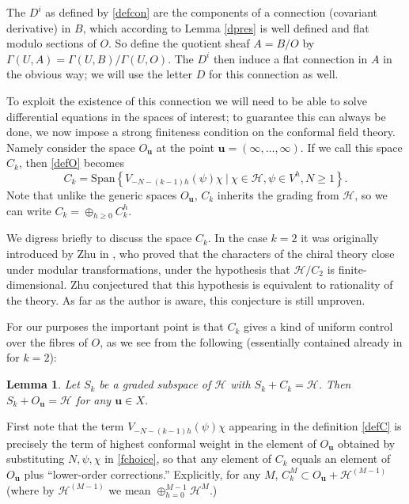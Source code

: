 \documentclass[a4paper,12pt]{article}
\newcommand{\Span}{\mathrm{Span}}
\newcommand{\uu}{{\mathbf u}}
\newcommand{\F}{{\mathcal H}}
\newtheorem{lem}[defn]{Lemma}
\newcommand{\oproof}[1]{\noindent {\bf Proof#1.\ }}
\begin{document}
The $D^i$ as defined by \eqref{defcon} are the components of a connection (covariant derivative) in $B$, which
according to Lemma \eqref{dpres} is well defined and flat modulo sections of $O$.
So define the quotient sheaf $A = B/O$ by $\Gamma(U,A) = \Gamma(U,B) / \Gamma(U,O)$.
The $D^i$ then induce a flat connection in $A$
in the obvious way; we will use the letter $D$ for this connection as well.

To exploit the existence of this connection we will need to be able to solve differential equations
in the spaces of interest; to guarantee this can always be done, we now impose a strong
finiteness condition on the conformal field theory.  Namely consider the space 
$O_\uu$ at the point $\uu = (\infty, \dots, \infty)$.  If we call this space $C_k$, then \eqref{defO} becomes
\begin{equation} \label{defC}
C_k = \Span\left\{ V_{-N-(k-1)h}(\psi) \chi \ \Big\vert \ \chi \in \F, \psi \in V^h, N \ge 1 \right\}.
\end{equation}
Note that unlike the generic spaces $O_\uu$, $C_k$ inherits the grading from $\F$, so we can write $C_k = \oplus_{h \ge 0} C_k^h$.

We digress briefly to discuss the space $C_k$.  In the case $k=2$ it was originally introduced by Zhu in \cite{Zhu}, who
proved that the characters of the chiral theory close under modular transformations, under the 
hypothesis that $\F / C_2$ is finite-dimensional.  Zhu conjectured that this hypothesis is equivalent to
rationality of the theory.  As far as the author is aware, this conjecture is still unproven.

For our purposes the important point is that 
$C_k$ gives a kind of uniform control over the fibres of $O$, as we see from the following (essentially contained
already in \cite{Zhu} for $k=2$):

\begin{lem} \label{basislem} Let $S_k$ be a graded subspace of $\F$ with $S_k + C_k = \F$.  Then $S_k + O_\uu = \F$ for any $\uu \in X$.
\end{lem}
\oproof{}
First note that the term $V_{-N-(k-1)h}(\psi) \chi$ appearing in the definition \eqref{defC} is precisely 
the term of highest conformal weight
in the element of $O_\uu$ obtained by substituting $N, \psi, \chi$ in \eqref{fchoice}, so that any
element of $C_k$ equals an element of $O_\uu$ plus ``lower-order corrections.''  Explicitly, for any $M$, $C_k^{M} \subset O_\uu + \F^{(M-1)}$ (where by $\F^{(M-1)}$ we mean $\oplus_{h=0}^{M-1} \F^M$.)
\end{document}
